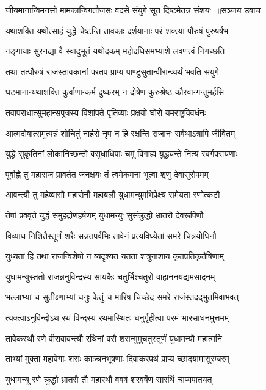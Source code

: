 \threelineshloka
{जीयमानान्विमनसो मामकान्विगतौजसः}
{वदसे संयुगे सूत दिष्टमेतन्न संशयः ॥सञ्जय उवाच}
{}


\twolineshloka
{यथाशक्ति यथोत्साहं युद्धे चेष्टन्ति तावकाः}
{दर्शयानाः परं शक्त्या पौरुषं पुरुषर्षभ}


\twolineshloka
{गङ्गायाः सुरनद्या वै स्वादुभूतं यथोदकम्}
{महोदधिसमभ्याशे लवणत्वं निगच्छति}


\twolineshloka
{तथा तत्पौरुषं राजंस्तावकानां परंतप}
{प्राप्य पाण्डुसुतान्वीरान्व्यर्थं भवति संयुगे}


\twolineshloka
{घटमानान्यथाशक्ति कुर्वाणान्कर्म दुष्करम्}
{न दोषेण कुरुश्रेष्ठ कौरवान्गन्तुमर्हसि}


\twolineshloka
{तवापराधात्सुमहान्सपुत्रस्य विशांपते}
{पृतिव्याः प्रक्षयो घोरो यमराष्ट्रविवर्धनः}


\twolineshloka
{आत्मदोषात्समुत्पन्नं शोचितुं नार्हसे नृप}
{न हि रक्षन्ति राजानः सर्वथाऽत्रापि जीवितम्}


\twolineshloka
{युद्धे सुकृतिनां लोकानिच्छन्तो वसुधाधिपाः}
{चमूं विगाह्य युद्ध्यन्ते नित्यं स्वर्गपरायणाः}


\twolineshloka
{पूर्वाह्णे तु महाराज प्रावर्तत जनक्षयः}
{तं त्वमेकमना भूत्वा शृणु देवासुरोपमम्}


\twolineshloka
{आवन्त्यौ तु महेष्वासौ महासेनौ महाबलौ}
{युधामन्युमभिप्रेक्ष्य समेयता रणोत्कटौ}


\twolineshloka
{तेषां प्रववृते युद्धं समुहद्रोणहर्षणम्}
{युधामन्युः सुसंक्रुद्धो भ्रातरौ देवरूपिणौ}


\twolineshloka
{विव्याध निशितैस्तूर्णं शरैः सन्नतपर्वभिः}
{तावेनं प्रत्यविध्येतां समरे चित्रयोधिनौ}


\twolineshloka
{युध्यतां हि तथा राजन्विशेषो न व्यदृश्यत}
{यततां शत्रुनाशाय कृतप्रतिकृतैषिणाम्}


\twolineshloka
{युधामन्युस्ततो राजन्ननुविन्दस्य सायकैः}
{चतुर्भिश्चतुरो वाहाननयद्यमसादनम्}


\twolineshloka
{भल्लाभ्यां च सुतीक्ष्णाभ्यां धनुः केतुं च मारिष}
{चिच्छेद समरे राजंस्तदद्भुतमिवाभवत्}


\twolineshloka
{त्यक्त्वाऽनुविन्दोऽथ रथं विन्दस्य रथमास्थितः}
{धनुर्गृहीत्वा परमं भारसाधनमुत्तमम्}


\twolineshloka
{तावेकस्थौ रणे वीरावावन्त्यौ रथिनां वरौ}
{शरान्मुमुचतुस्तूर्णं युधामन्यौ महात्मनि}


\twolineshloka
{ताभ्यां मुक्ता महावेगाः शराः काञ्चनभूषणाः}
{दिवाकरपथं प्राप्य च्छादयामासुरम्बरम्}


\twolineshloka
{युधामन्यू रणे क्रुद्धो भ्रातरौ तौ महारथौ}
{ववर्ष शरवर्षेण सारथिं चाप्यपातयत्}


